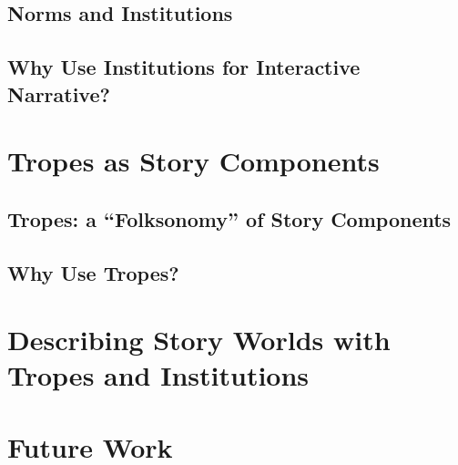 \documentclass[11pt]{report}
\begin{document}
\section{Norms and Institutions}
\label{sec:norms-and-institutions}

\section{Why Use Institutions for Interactive Narrative?}
\label{sec:why-use-institutions}

\chapter{Tropes as Story Components}
\label{cha:tropes}
\section{Tropes: a ``Folksonomy'' of Story Components}

\section{Why Use Tropes?}

\chapter{Describing Story Worlds with Tropes and Institutions}
\label{cha:tropes-and-institutions}

\chapter{Future Work}
\label{cha:future}




\end{document}
